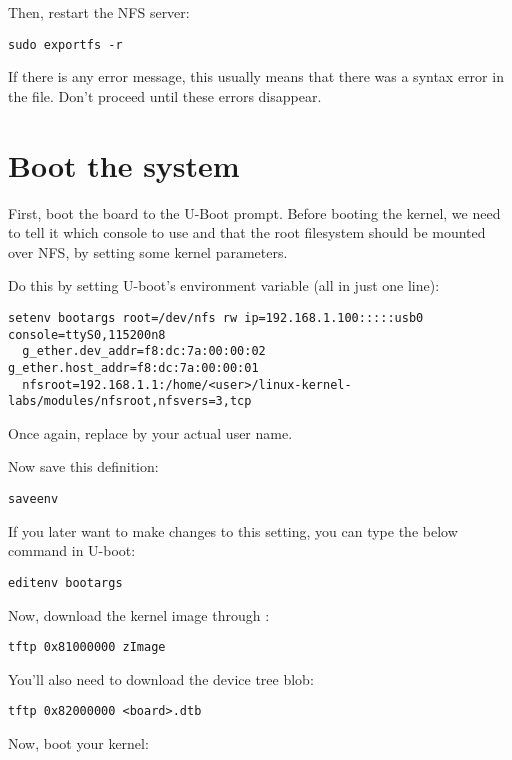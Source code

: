 Then, restart the NFS server:

\begin{verbatim}
sudo exportfs -r
\end{verbatim}

If there is any error message, this usually means that there was a
syntax error in the  file. Don't proceed until these
errors disappear.

\section{Boot the system}

First, boot the board to the U-Boot prompt. Before booting the kernel,
we need to tell it which console to use and that the root filesystem
should be mounted over NFS, by setting some kernel parameters.

Do this by setting U-boot's  environment variable (all in
just one line):

\begin{verbatim}
setenv bootargs root=/dev/nfs rw ip=192.168.1.100:::::usb0 console=ttyS0,115200n8
  g_ether.dev_addr=f8:dc:7a:00:00:02 g_ether.host_addr=f8:dc:7a:00:00:01
  nfsroot=192.168.1.1:/home/<user>/linux-kernel-labs/modules/nfsroot,nfsvers=3,tcp
\end{verbatim}

Once again, replace  by your actual user name.

Now save this definition:
\begin{verbatim}
saveenv
\end{verbatim}

If you later want to make changes to this setting, you can type the
below command in U-boot:

\begin{verbatim}
editenv bootargs
\end{verbatim}

Now, download the kernel image through :

\begin{verbatim}
tftp 0x81000000 zImage
\end{verbatim}

You'll also need to download the device tree blob:

\begin{verbatim}
tftp 0x82000000 <board>.dtb
\end{verbatim}

Now, boot your kernel:

